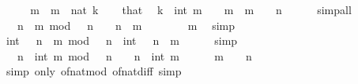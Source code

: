 \begin{isabellebody}
%
\isadelimproof
%
\endisadelimproof
%
\isatagproof
{}\isamarkupfalse%
\ {\isacharminus}{\kern0pt}\isanewline
\ \ \isamarkupfalse%
\ m\ \ {\isacartoucheopen}m\ {\isacharequal}{\kern0pt}\ nat\ k{\isacartoucheclose}\isanewline
\ \ \isamarkupfalse%
\ that\ \isamarkupfalse%
\ {\isacartoucheopen}k\ {\isacharequal}{\kern0pt}\ int\ m{\isacartoucheclose}\ \ {\isacartoucheopen}{}\ {\isacharless}{\kern0pt}\ m{\isacartoucheclose}\ \ {\isacartoucheopen}m\ {\isasymle}\ {}\ {\isacharcircum}{\kern0pt}\ n{\isacartoucheclose}\isanewline
\ \ \ \ \isamarkupfalse%
\ simp{\isacharunderscore}{\kern0pt}all\isanewline
\ \ \isamarkupfalse%
\ {\isacartoucheopen}{\isacharparenleft}{\kern0pt}{}\ {\isacharcircum}{\kern0pt}\ n\ {\isacharminus}{\kern0pt}\ m{\isacharparenright}{\kern0pt}\ mod\ {}\ {\isacharcircum}{\kern0pt}\ n\ {\isacharequal}{\kern0pt}\ {}\ {\isacharcircum}{\kern0pt}\ n\ {\isacharminus}{\kern0pt}\ m{\isacartoucheclose}\isanewline
\ \ \ \ \isamarkupfalse%
\ {\isacartoucheopen}{}\ {\isacharless}{\kern0pt}\ m{\isacartoucheclose}\ \isamarkupfalse%
\ simp\isanewline
\ \ \isamarkupfalse%
\ \isamarkupfalse%
\ {\isacartoucheopen}int\ {\isacharparenleft}{\kern0pt}{\isacharparenleft}{\kern0pt}{}\ {\isacharcircum}{\kern0pt}\ n\ {\isacharminus}{\kern0pt}\ m{\isacharparenright}{\kern0pt}\ mod\ {}\ {\isacharcircum}{\kern0pt}\ n{\isacharparenright}{\kern0pt}\ {\isacharequal}{\kern0pt}\ int\ {\isacharparenleft}{\kern0pt}{}\ {\isacharcircum}{\kern0pt}\ n\ {\isacharminus}{\kern0pt}\ m{\isacharparenright}{\kern0pt}{\isacartoucheclose}\isanewline
\ \ \ \ \isamarkupfalse%
\ simp\isanewline
\ \ \isamarkupfalse%
\ \isamarkupfalse%
\ {\isacartoucheopen}{\isacharparenleft}{\kern0pt}{}\ {\isacharcircum}{\kern0pt}\ n\ {\isacharminus}{\kern0pt}\ int\ m{\isacharparenright}{\kern0pt}\ mod\ {}\ {\isacharcircum}{\kern0pt}\ n\ {\isacharequal}{\kern0pt}\ {}\ {\isacharcircum}{\kern0pt}\ n\ {\isacharminus}{\kern0pt}\ int\ m{\isacartoucheclose}\isanewline
\ \ \ \ \isamarkupfalse%
\ {\isacartoucheopen}m\ {\isasymle}\ {}\ {\isacharcircum}{\kern0pt}\ n{\isacartoucheclose}\ \isamarkupfalse%
\ {\isacharparenleft}{\kern0pt}simp\ only{\isacharcolon}{\kern0pt}\ of{\isacharunderscore}{\kern0pt}nat{\isacharunderscore}{\kern0pt}mod\ of{\isacharunderscore}{\kern0pt}nat{\isacharunderscore}{\kern0pt}diff{\isacharparenright}{\kern0pt}\ simp\isanewline

\end{isabellebody}
